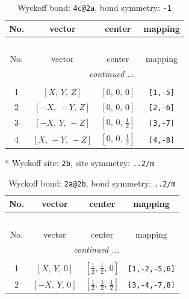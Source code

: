 \documentclass[fleqn,8pt]{jsarticle}
\begin{document}
\renewcommand{\arraystretch}{1.2}
\begin{longtable}{cccc}
\caption{Wyckoff bond: {\tt 4c@2a}, bond symmetry: {\tt -1}}
 \\
 \hline \hline
No. & vector & center & mapping \\ \hline \endfirsthead

\multicolumn{3}{l}{\tablename\ \thetable{}} \\
 \hline \hline
No. & vector & center & mapping \\ \hline \endhead

 \hline \hline
\multicolumn{3}{r}{\footnotesize\it continued ...} \\ \endfoot

 \hline \hline
\multicolumn{3}{r}{} \\ \endlastfoot

1 & $\left[ X,\, Y,\, Z \right]$ & $\left[ 0,\, 0,\, 0 \right]$ & {\tt [1,-5]} \\ \hline
2 & $\left[ - X,\, - Y,\, Z \right]$ & $\left[ 0,\, 0,\, 0 \right]$ & {\tt [2,-6]} \\ \hline
3 & $\left[ - X,\, Y,\, - Z \right]$ & $\left[ 0,\, 0,\, \frac{1}{2} \right]$ & {\tt [3,-7]} \\ \hline
4 & $\left[ X,\, - Y,\, - Z \right]$ & $\left[ 0,\, 0,\, \frac{1}{2} \right]$ & {\tt [4,-8]} \\
\end{longtable}
* Wyckoff site: {\tt 2b}, site symmetry: {\tt ..2/m}
\renewcommand{\arraystretch}{1.2}
\begin{longtable}{cccc}
\caption{Wyckoff bond: {\tt 2a@2b}, bond symmetry: {\tt ..2/m}}
 \\
 \hline \hline
No. & vector & center & mapping \\ \hline \endfirsthead

\multicolumn{3}{l}{\tablename\ \thetable{}} \\
 \hline \hline
No. & vector & center & mapping \\ \hline \endhead

 \hline \hline
\multicolumn{3}{r}{\footnotesize\it continued ...} \\ \endfoot

 \hline \hline
\multicolumn{3}{r}{} \\ \endlastfoot

1 & $\left[ X,\, Y,\, 0 \right]$ & $\left[ \frac{1}{2},\, \frac{1}{2},\, 0 \right]$ & {\tt [1,-2,-5,6]} \\ \hline
2 & $\left[ - X,\, Y,\, 0 \right]$ & $\left[ \frac{1}{2},\, \frac{1}{2},\, \frac{1}{2} \right]$ & {\tt [3,-4,-7,8]} \\
\end{longtable}
\end{document}
